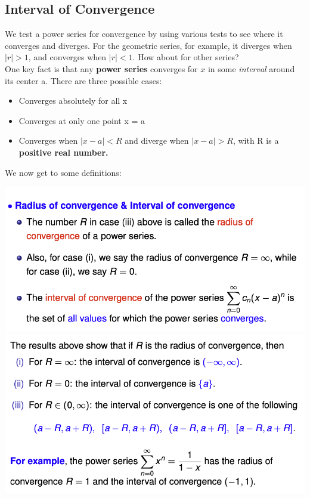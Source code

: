 \documentclass{article}
\begin{document}
\subsection{Interval of Convergence}
We test a power series for convergence by using various tests to see where it converges and diverges. For the geometric series, for example, it diverges when $|r| > 1$, and converges when $ |r| < 1.$ How about for other series? \\
One key fact is that any \textbf{power series} converges for $x$ in some \textit{interval} around its center a. There are three possible cases: 
\begin{itemize}
    \item Converges absolutely for all x
    \item Converges at only one point x = a 
    \item Converges when $|x-a| < R$ and diverge when $|x-a| > R$, with R is a \textbf{positive real number.}
\end{itemize}
We now get to some definitions: 
\begin{center}
        \includegraphics[scale = 0.7]{radi convergence.png}
        \includegraphics[scale = 0.7]{implications of radius .png}
    \end{center} 
\end{document}
